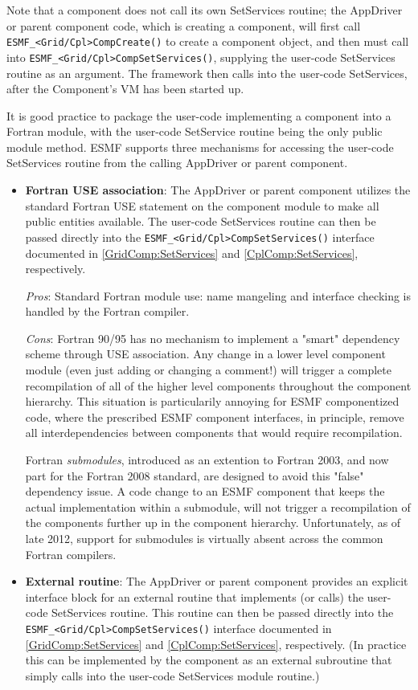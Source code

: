 Note that a component does not call its own SetServices routine;
the AppDriver or parent component code, which is creating a component, 
will first call {\tt ESMF\_<Grid/Cpl>CompCreate()} to create a component object, and then must call into {\tt ESMF\_<Grid/Cpl>CompSetServices()}, supplying the user-code SetServices routine as an argument. The framework then calls into the user-code SetServices, after the Component's VM has been started up.

It is good practice to package the user-code implementing a component into a Fortran module, with the user-code SetService routine being the only public module method. ESMF supports three mechanisms for accessing the user-code SetServices routine from the calling AppDriver or parent component.

\begin{itemize}
\item {\bf Fortran USE association}: The AppDriver or parent component utilizes the standard Fortran USE statement on the component module to make all public entities available. The user-code SetServices routine can then be passed directly into the {\tt ESMF\_<Grid/Cpl>CompSetServices()} interface documented in \ref{GridComp:SetServices} and \ref{CplComp:SetServices}, respectively.

{\em Pros}: Standard Fortran module use: name mangeling and interface checking is handled by the Fortran compiler.

{\em Cons}: Fortran 90/95 has no mechanism to implement a "smart" dependency scheme through USE association. Any change in a lower level component module (even just adding or changing a comment!) will trigger a complete recompilation of all of the higher level components throughout the component hierarchy. This situation is particularily annoying for ESMF componentized code, where the prescribed ESMF component interfaces, in principle, remove all interdependencies between components that would require recompilation.

Fortran {\em submodules}, introduced as an extention to Fortran 2003, and now part for the Fortran 2008 standard, are designed to avoid this "false" dependency issue. A code change to an ESMF component that keeps the actual implementation within a submodule, will not trigger a recompilation of the components further up in the component hierarchy. Unfortunately, as of late 2012, support for submodules is virtually absent across the common Fortran compilers.

\item {\bf External routine}: The AppDriver or parent component provides an explicit interface block for an external routine that implements (or calls) the user-code SetServices routine. This routine can then be passed directly into the {\tt ESMF\_<Grid/Cpl>CompSetServices()} interface documented in \ref{GridComp:SetServices} and \ref{CplComp:SetServices}, respectively. (In practice this can be implemented by the component as an external subroutine that simply calls into the user-code SetServices module routine.)


\end{itemize}
